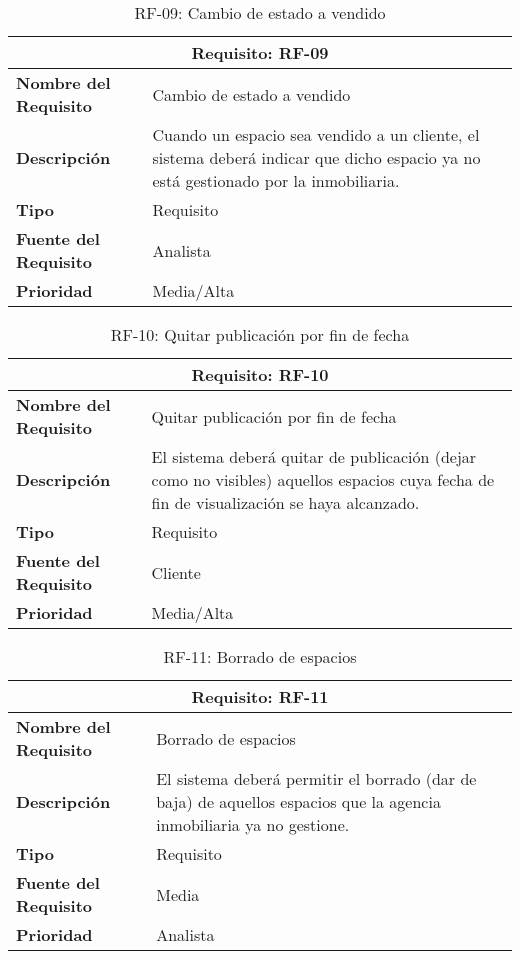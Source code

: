 \begin{table}[H]
\begin{center}
\begin{tabular}{p{} p{7cm}}
\multicolumn{2}{c}{\textbf{Requisito: RF-09} } \\
\hline \hline
\textbf{Nombre del Requisito} &  Cambio de estado a vendido \\
\hline
\textbf{Descripción} & Cuando un espacio sea vendido a un cliente, el sistema deberá indicar que dicho espacio ya no está gestionado por la inmobiliaria.\\
\hline
\textbf{Tipo} & Requisito  \\
\hline
\textbf{Fuente del Requisito} & Analista \\
\hline
\textbf{Prioridad} &  Media/Alta \\ \hline
\end{tabular}
\caption{RF-09: Cambio de estado a vendido}
\label{tab:RF-09}
\end{center}
\end{table}

\begin{table}[H]
\begin{center}
\begin{tabular}{p{} p{7cm}}
\multicolumn{2}{c}{\textbf{Requisito: RF-10} } \\
\hline \hline
\textbf{Nombre del Requisito} &  Quitar publicación por fin de fecha \\
\hline
\textbf{Descripción} & El sistema deberá quitar de publicación (dejar como no visibles) aquellos espacios cuya fecha de fin de visualización se haya alcanzado.\\
\hline
\textbf{Tipo} & Requisito  \\
\hline
\textbf{Fuente del Requisito} & Cliente  \\
\hline
\textbf{Prioridad} &  Media/Alta \\ \hline
\end{tabular}
\caption{RF-10: Quitar publicación por fin de fecha}
\label{tab:RF-10}
\end{center}
\end{table}

\begin{table}[H]
\begin{center}
\begin{tabular}{p{} p{7cm}}
\multicolumn{2}{c}{\textbf{Requisito: RF-11} } \\
\hline \hline
\textbf{Nombre del Requisito} &  Borrado de espacios \\
\hline
\textbf{Descripción} & El sistema deberá permitir el borrado (dar de baja) de aquellos espacios que la agencia inmobiliaria ya no gestione.\\
\hline
\textbf{Tipo} & Requisito  \\
\hline
\textbf{Fuente del Requisito} & Media  \\
\hline
\textbf{Prioridad} &  Analista \\ \hline
\end{tabular}
\caption{RF-11: Borrado de espacios}
\label{tab:RF-11}
\end{center}
\end{table}


